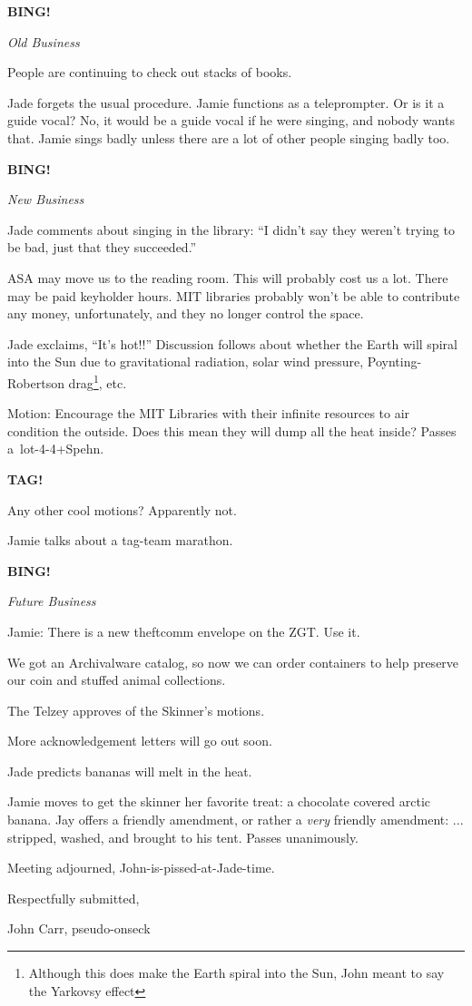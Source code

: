 \documentclass[12pt]{article}
\newcommand{\bing}{{\bf BING!} }
\newcommand{\goto}[1]{\bing \vskip 12pt \centerline{{\em{#1}}}}
\begin{document}
\goto{Old Business}

People are continuing to check out stacks of books.

Jade forgets the usual procedure.  Jamie functions as a teleprompter.
Or is it a guide vocal?  No, it would be a guide vocal if he were
singing, and nobody wants that.  Jamie sings badly unless there are
a lot of other people singing badly too.


\goto{New Business}

Jade comments about singing in the library: ``I didn't say they weren't
trying to be bad, just that they succeeded.''

ASA may move us to the reading room.  This will probably cost us a lot.
There may be paid keyholder hours.  MIT libraries probably won't be able
to contribute any money, unfortunately, and they no longer control the space.

Jade exclaims, ``It's hot!!''  Discussion follows about whether the Earth
will spiral into the Sun due to gravitational radiation, solar wind
pressure, Poynting-Robertson drag\footnote{Although this does make
the Earth spiral into the Sun, John meant to say the Yarkovsy effect}, etc.

Motion: Encourage the MIT Libraries with their infinite resources to
air condition the outside.  Does this mean they will dump all the heat
inside?  Passes \hbox{a lot-4-4+Spehn}.

{\bf TAG!}

Any other cool motions?  Apparently not.

Jamie talks about a tag-team marathon.


\goto{Future Business}

Jamie: There is a new theftcomm envelope on the ZGT.  Use it.

We got an Archivalware catalog, so now we can order containers to
help preserve our coin and stuffed animal collections.

The Telzey approves of the Skinner's motions.

More acknowledgement letters will go out soon.

Jade predicts bananas will melt in the heat.

Jamie moves to get the skinner her favorite treat: a chocolate covered
arctic banana.  Jay offers a friendly amendment, or rather a {\em very}
friendly amendment: ... stripped, washed, and brought to his tent.
Passes unanimously.

\vspace{12pt}

\noindent
Meeting adjourned, John-is-pissed-at-Jade-time.

\vspace{18pt}

\centerline{Respectfully submitted,}
\centerline{John Carr, pseudo-onseck}
\end{document}
